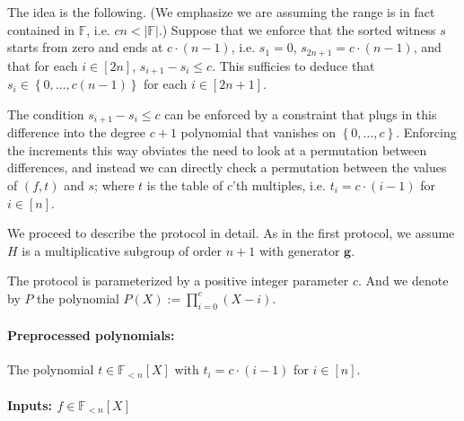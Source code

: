 \documentclass[11pt]{article} %
\newcommand{\F}{\ensuremath{\mathbb F}\xspace}
\newcommand{\defeq}{:=}
\newcommand{\set}[1]{\ensuremath{\left\{#1\right\}}\xspace}
\newcommand{\hgen}{\ensuremath{\mathbf{g}}\xspace}
\newcommand{\polysofdeg}[1]{\ensuremath{\F_{< #1}[X]}\xspace}
\begin{document}
The idea is the following. (We emphasize we are assuming the range is in fact contained in \F, i.e. $cn < |\F|$.)
Suppose that we enforce that the sorted witness $s$ starts from zero and ends at $c\cdot (n-1)$, i.e. $s_1=0$, $s_{2n+1} = c\cdot (n-1)$, and that for each $i\in [2n]$, $s_{i+1}-s_i \leq c$.
This sufficies to deduce that $s_i \in \set{0,\ldots,c(n-1)}$ for each $i\in [2n+1]$.

The condition $s_{i+1}-s_i \leq c$ can be enforced by a constraint that plugs in this difference into the degree $c+1$ polynomial that vanishes on \set{0,\ldots,c}. Enforcing the increments this way obviates the need to look at a permutation between differences, and instead we can directly check a permutation between the values of $(f,t)$ and $s$; where $t$ is the table of $c$'th multiples, i.e. $t_i = c\cdot (i-1)$ for $i\in [n]$.

We proceed to describe the protocol in detail.
As in the first protocol, we assume $H$ is a multiplicative subgroup of order $n+1$ with generator \hgen.

The protocol is parameterized by a positive integer parameter $c$.
And we denote by $P$ the polynomial
$P(X)\defeq \prod_{i= 0}^c(X-i)$.
\paragraph{Preprocessed polynomials:}
The polynomial $t \in \polysofdeg{n}$  with $t_i = c\cdot (i-1)$ for $i\in [n]$.

\paragraph{Inputs: $f\in \polysofdeg{n}$}
\end{document}
